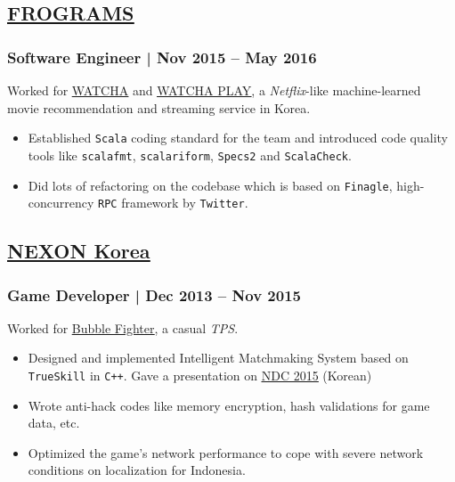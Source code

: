 \documentclass[11pt]{article}
\begin{document}
\subsection*{\underline{\href{http://frograms.com}{FROGRAMS}}}
\label{sec:org659ec61}
\subsubsection*{Software Engineer  | Nov 2015 – May 2016}
\label{sec:org3b9ba78}
Worked for \uline{\href{https://watcha.net/}{WATCHA}} and \uline{\href{https://play.watcha.net}{WATCHA PLAY}},
a \emph{Netflix}-like machine-learned movie recommendation and streaming service in Korea.

\begin{itemize}[label=$\circ$,itemsep=-0.5ex]
\item Established \texttt{Scala} coding standard for the team and introduced code quality tools like
\texttt{scalafmt}, \texttt{scalariform}, \texttt{Specs2} and \texttt{ScalaCheck}.
\item Did lots of refactoring on the codebase which is based on \texttt{Finagle}, high-concurrency \texttt{RPC} framework by \texttt{Twitter}.
\end{itemize}

\subsection*{\underline{\href{http://company.nexon.com/Eng/}{NEXON Korea}}}
\label{sec:orgfbaea8b}
\subsubsection*{Game Developer  | Dec 2013 – Nov 2015}
\label{sec:org920b9e9}
Worked for \uline{\href{http://bf.nexon.com}{Bubble Fighter}}, a casual \emph{TPS}.

\begin{itemize}[label=$\circ$,itemsep=-0.5ex]
\item Designed and implemented Intelligent Matchmaking System based on \texttt{TrueSkill} in \texttt{C++}.
Gave a presentation on \uline{\href{http://ndcreplay.nexon.com/NDC2015/sessions/NDC2015\_0048.html}{NDC 2015}} (Korean)
\item Wrote anti-hack codes like memory encryption, hash validations for game data, etc.
\item Optimized the game's network performance to cope with severe network conditions on localization for Indonesia.
\end{itemize}
\end{document}
